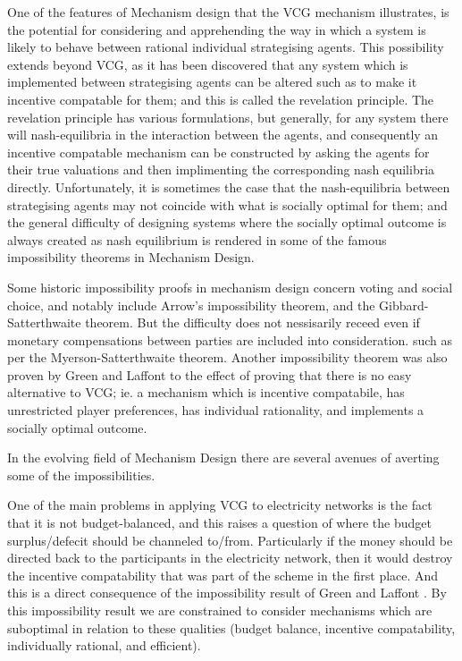 One of the features of Mechanism design that the VCG mechanism illustrates, is the potential for considering and apprehending the way in which a system is likely to behave between rational individual strategising agents.
This possibility extends beyond VCG, as it has been discovered that any system which is implemented between strategising agents can be altered such as to make it incentive compatable for them; and this is called the revelation principle.\cite{RePEc:ecm:emetrp:v:41:y:1973:i:4:p:587-601} \cite[Chapter~2.3]{37377}
The revelation principle has various formulations, but generally, for any system there will nash-equilibria in the interaction between the agents, and consequently an incentive compatable mechanism can be constructed by asking the agents for their true valuations and then implimenting the corresponding nash equilibria directly.
Unfortunately, it is sometimes the case that the nash-equilibria between strategising agents may not coincide with what is socially optimal for them; and the general difficulty of designing systems where the socially optimal outcome is always created as nash equilibrium is rendered in some of the famous impossibility theorems in Mechanism Design. %

Some historic impossibility proofs in mechanism design concern voting and social choice, and notably include Arrow's impossibility theorem, and the Gibbard-Satterthwaite theorem.
But the difficulty does not nessisarily receed even if monetary compensations between parties are included into consideration. such as per the Myerson-Satterthwaite theorem.
Another impossibility theorem was also proven by Green and Laffont \cite{29088} to the effect of proving that there is no easy alternative to VCG; ie. a mechanism which is incentive compatabile, has unrestricted player preferences, has individual rationality, and implements a socially optimal outcome.

In the evolving field of Mechanism Design there are several avenues of averting some of the impossibilities.


One of the main problems in applying VCG to electricity networks is the fact that it is not budget-balanced, and this raises a question of where the budget surplus/defecit should be channeled to/from.
Particularly if the money should be directed back to the participants in the electricity network, then it would destroy the incentive compatability that was part of the scheme in the first place.
And this is a direct consequence of the impossibility result of Green and Laffont \cite{29088}. By this impossibility result we are constrained to consider mechanisms which are suboptimal in relation to these qualities (budget balance, incentive compatability, individually rational, and efficient).

